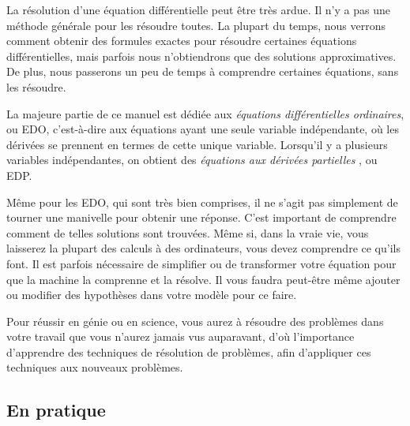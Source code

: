 La résolution d'une équation différentielle peut être très ardue.  Il n'y a pas une méthode générale pour les résoudre toutes. La plupart du temps, nous verrons comment obtenir des formules exactes pour résoudre certaines équations différentielles, mais parfois nous n'obtiendrons que des solutions approximatives. De plus, nous passerons un peu de temps à comprendre certaines équations, sans les résoudre.

La majeure partie de ce manuel est dédiée aux 
\emph{équations différentielles ordinaires},
ou EDO, c'est-à-dire aux équations ayant une seule variable indépendante, où les dérivées se prennent en termes de cette unique variable.  Lorsqu'il y a plusieurs variables indépendantes, on obtient des 
\emph{équations aux dérivées partielles },
ou EDP.

Même pour les EDO, qui sont très bien comprises, il ne s'agit pas simplement de tourner une manivelle pour obtenir une réponse.  
C'est important de comprendre comment de telles solutions sont trouvées.  Même si, dans la vraie vie, vous laisserez la plupart des calculs à des ordinateurs, vous devez comprendre ce qu'ils font.  Il est parfois nécessaire de simplifier ou de transformer votre équation pour que la machine la comprenne et la résolve.  Il vous faudra peut-être même ajouter ou modifier des hypothèses dans votre modèle pour ce faire.
  
Pour réussir en génie ou en science, vous aurez à résoudre des problèmes dans votre travail que vous n'aurez jamais vus auparavant, d'où l'importance d'apprendre des techniques de résolution de problèmes, afin d'appliquer ces techniques aux nouveaux problèmes.  
 
\subsection{En pratique}
\begin{myfig}
\end{myfig}

